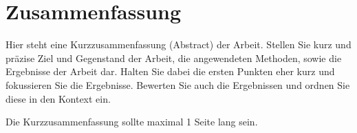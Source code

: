 \chapter*{Zusammenfassung}
Hier steht eine Kurzzusammenfassung (Abstract) der Arbeit. Stellen Sie kurz und präzise Ziel und Gegenstand der Arbeit, die angewendeten Methoden, sowie die Ergebnisse der Arbeit dar. Halten Sie dabei die ersten Punkten eher kurz und fokussieren Sie die Ergebnisse. Bewerten Sie auch die Ergebnissen und ordnen Sie diese in den Kontext ein.

Die Kurzzusammenfassung sollte maximal 1 Seite lang sein.
